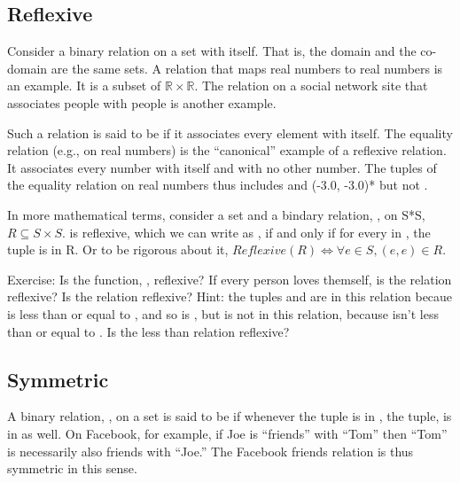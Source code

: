 \documentclass[letterpaper,10pt,english]{sphinxmanual}
\begin{document}
\subsection{Reflexive}
\label{\detokenize{07-set-theory:reflexive}}
Consider a binary relation on a set with itself.  That is, the domain
and the co-domain are the same sets. A relation that maps real numbers
to real numbers is an example. It is a subset of \({\mathbb R}
\times {\mathbb R}\). The  relation on a social network site
that associates people with people is another example.

Such a relation is said to be  if it associates every
element with itself.  The equality relation (e.g., on real numbers) is
the “canonical” example of a reflexive relation. It associates every
number with itself and with no other number. The tuples of the
equality relation on real numbers thus includes  and
(-3.0, -3.0)* but not .

In more mathematical terms, consider a set  and a bindary relation,
, on S*S, \(R \subseteq S \times S.\)  is reflexive, which
we can write as , if and only if for every  in ,
the tuple  is in R. Or to be rigorous about it,
\(Reflexive(R) \iff \forall e \in S, (e,e) \in R.\)

Exercise: Is the function, , reflexive? If every person loves
themself, is the  relation reflexive? Is the  relation reflexive? Hint: the tuples  and  are
in this relation becaue  is less than or equal to , and so is
, but  is not in this relation, because  isn’t less than
or equal to . Is the less than relation reflexive?


\subsection{Symmetric}
\label{\detokenize{07-set-theory:symmetric}}
A binary relation, , on a set  is said to be  if
whenever the tuple  is in , the tuple,  is in  as
well. On Facebook, for example, if Joe is “friends” with “Tom” then
“Tom” is necessarily also friends with “Joe.” The Facebook friends
relation is thus symmetric in this sense.
\end{document}
